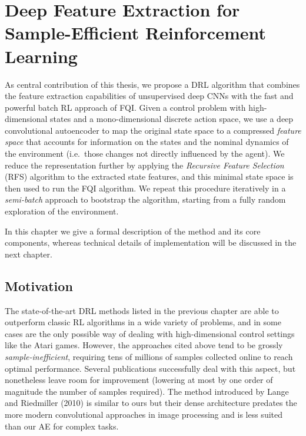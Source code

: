 \chapter{Deep Feature Extraction for Sample-Efficient Reinforcement Learning}
\label{chapter4_research_problem}
\thispagestyle{empty}

\vspace{0.5cm}

As central contribution of this thesis, we propose a DRL algorithm that 
combines the feature extraction capabilities of unsupervised deep CNNs with the 
fast and powerful batch RL approach of FQI. 
Given a control problem with high-dimensional states and a mono-dimensional 
discrete action space, we use a deep convolutional autoencoder to map the 
original state space to a compressed \textit{feature space} that accounts for 
information on the states and the nominal dynamics of the environment (i.e.\ 
those changes not directly influenced by the agent). 
We reduce the representation further by applying the \textit{Recursive Feature
Selection} (RFS) algorithm to the extracted state features, and this minimal 
state space is then used to run the FQI algorithm. 
We repeat this procedure iteratively in a \textit{semi-batch} approach to 
bootstrap the algorithm, starting from a fully random exploration of the 
environment.

In this chapter we give a formal description of the method and its core 
components, whereas technical details of implementation will be discussed in the 
next chapter.

\section{Motivation}
The state-of-the-art DRL methods listed in the previous chapter are able to 
outperform classic RL algorithms in a wide variety of problems, and in some 
cases are the only possible way of dealing with high-dimensional control 
settings like the Atari games. 
However, the approaches cited above tend to be grossly 
\textit{sample-inefficient}, requiring tens of millions of samples collected
online to reach optimal performance. Several publications successfully deal 
with this aspect, but nonetheless leave room for improvement (lowering at most
by one order of magnitude the number of samples required).
The method introduced by Lange and Riedmiller (2010) \cite{lange2010deep} is 
similar to ours but their dense architecture predates the more modern 
convolutional approaches in image processing and is less suited than our AE for 
complex tasks.


